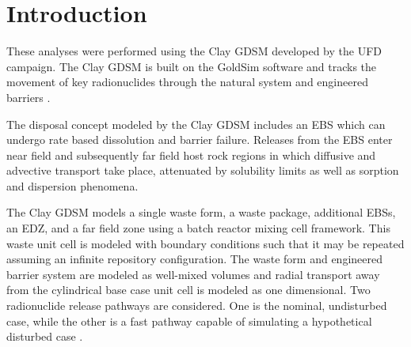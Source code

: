 
\section{Introduction}
These analyses were performed using the Clay \gls{GDSM} developed by the 
\gls{UFD} campaign\cite{clayton_generic_2011}. The Clay \gls{GDSM} is built on the 
GoldSim software and tracks the movement of key radionuclides through the 
natural system and engineered barriers \cite{golder_goldsim_2010, 
golder_goldsim_ct_2010}.

The disposal concept modeled by the Clay \gls{GDSM} includes an \gls{EBS} which 
can undergo rate based dissolution and barrier failure. Releases from the \gls{EBS} enter 
near field and subsequently far field host rock regions in which diffusive and 
advective transport take place, attenuated by solubility limits as well as 
sorption and dispersion phenomena.  

The Clay \gls{GDSM} models a single waste form, a waste package, additional 
\glspl{EBS}, 
an \gls{EDZ}, and a far field zone using a batch reactor mixing cell framework. This waste unit cell is modeled 
with boundary conditions such that it may be repeated assuming an infinite 
repository configuration. The waste form and engineered barrier system are modeled as well-mixed volumes 
and radial transport away from the cylindrical base case unit cell is modeled as  
one dimensional. Two radionuclide release pathways are considered. One is the nominal, 
undisturbed case, while the other is a fast pathway capable of simulating a 
hypothetical disturbed case 
\cite{clayton_generic_2011}.

